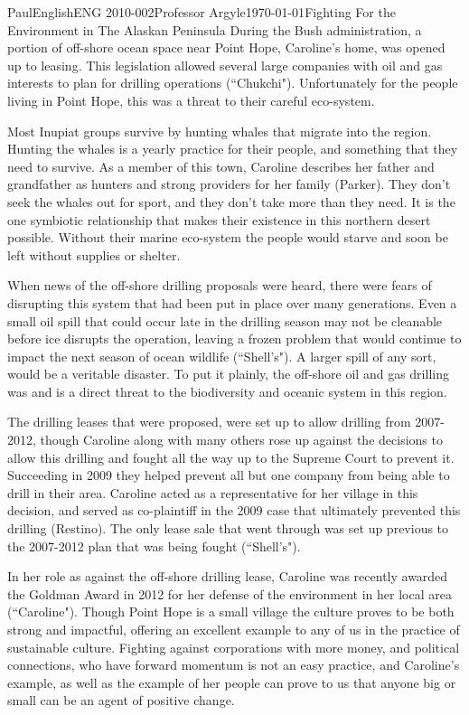 \documentclass[12pt,letterpaper]{article}
\begin{document}
\begin{mla}{Paul}{English}{ENG 2010-002}{Professor Argyle}{\today}{Fighting For the Environment in The Alaskan Peninsula}
During the Bush administration, a portion of off-shore ocean space near Point Hope, Caroline's home, was opened up to leasing. This legislation allowed several large companies with oil and gas interests to plan for drilling operations (``Chukchi"). Unfortunately for the people living in Point Hope, this was a threat to their careful eco-system.

Most Inupiat groups survive by hunting whales that migrate into the region. Hunting the whales is a yearly practice for their people, and something that they need to survive. As a member of this town, Caroline describes her father and grandfather as hunters and strong providers for her family (Parker). They don't seek the whales out for sport, and they don't take more than they need. It is the one symbiotic relationship that makes their existence in this northern desert possible. Without their marine eco-system the people would starve and soon be left without supplies or shelter.

When news of the off-shore drilling proposals were heard, there were fears of disrupting this system that had been put in place over many generations. Even a small oil spill that could occur late in the drilling season may not be cleanable before ice disrupts the operation, leaving a frozen problem that would continue to impact the next season of ocean wildlife (``Shell's"). A larger spill of any sort, would be a veritable disaster. To put it plainly, the off-shore oil and gas drilling was and is a direct threat to the biodiversity and oceanic system in this region.

The drilling leases that were proposed, were set up to allow drilling from 2007-2012, though Caroline along with many others rose up against the decisions to allow this drilling and fought all the way up to the Supreme Court to prevent it. Succeeding in 2009 they helped prevent all but one company from being able to drill in their area. Caroline acted as a representative for her village in this decision, and served as co-plaintiff in the 2009 case that ultimately prevented this drilling (Restino). The only lease sale that went through was set up previous to the 2007-2012 plan that was being fought (``Shell's").

In her role as against the off-shore drilling lease, Caroline was recently awarded the Goldman Award in 2012 for her defense of the environment in her local area (``Caroline"). Though Point Hope is a small village the culture proves to be both strong and impactful, offering an excellent example to any of us in the practice of sustainable culture. Fighting against corporations with more money, and political connections, who have forward momentum is not an easy practice, and Caroline's example, as well as the example of her people can prove to us that anyone big or small can be an agent of positive change. 


\end{mla}
\end{document}

